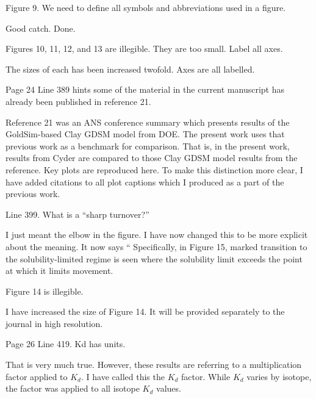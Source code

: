 \documentclass[answers,12pt]{exam}
\begin{document}
\begin{questions}
 

\question Figure 9. We need to define all symbols and abbreviations used in a 
figure.
\begin{solution}
Good catch. Done.
\end{solution}

 

\question Figures 10, 11, 12, and 13 are illegible. They are too small. Label 
all axes.
\begin{solution}
The sizes of each has been increased twofold. Axes are all labelled.  
\end{solution}

\question Page 24 Line 389 hints some of the material in the current manuscript 
has already been published in reference 21.
\begin{solution}
        Reference 21 was an ANS conference summary which presents results of 
        the GoldSim-based Clay GDSM model from DOE. The present work uses that 
        previous work as a benchmark for comparison. That is, in the present 
        work, results from Cyder are compared to those Clay GDSM model results 
        from the reference. Key plots are reproduced here. To make this 
        distinction more clear, I have added citations to all plot captions 
        which I produced as a part of the previous work.
\end{solution}


\question Line 399. What is a ``sharp turnover?''
\begin{solution}
I just meant the elbow in the figure. I have now changed this to be more 
        explicit about the meaning. It now says `` Specifically, in Figure 15, 
        marked transition to the solubility-limited regime is seen where the 
        solubility limit exceeds the point at which it limits movement.  
\end{solution}

 

\question Figure 14 is illegible.
\begin{solution}
I have increased the size of Figure 14.
        It will be provided separately to the journal in high resolution. 

\end{solution}

 

\question Page 26 Line 419. Kd has units.
\begin{solution}
That is very much true. However, these results are referring to a 
multiplication factor applied to $K_d$. I have called this the $K_d$ factor. 
While $K_d$ varies by isotope, the factor was applied to all isotope $K_d$ 
values.  \end{solution}



\end{questions}
\end{document}
